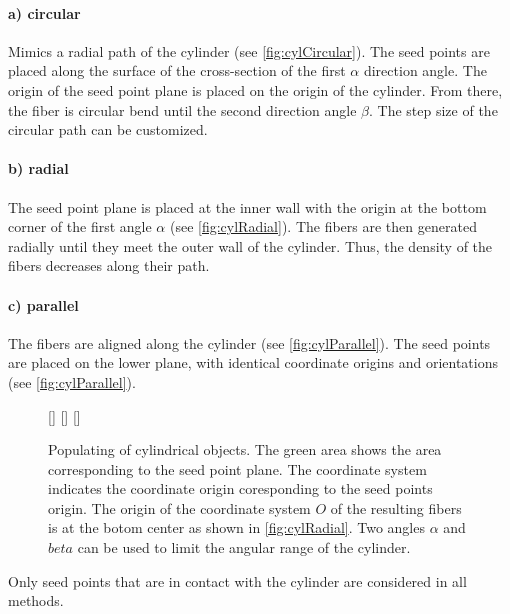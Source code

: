 \paragraph{a) circular}
Mimics a radial path of the cylinder (see \cref{fig:cylCircular}).
The seed points are placed along the surface of the cross-section of the first $\alpha$ direction angle.
The origin of the seed point plane is placed on the origin of the cylinder.
From there, the fiber is circular bend until the second direction angle $\beta$.
The step size of the circular path can be customized.
%
\paragraph{b) radial}
The seed point plane is placed at the inner wall with the origin at the bottom corner of the first angle $\alpha$ (see \cref{fig:cylRadial}).
The fibers are then generated radially until they meet the outer wall of the cylinder.
Thus, the density of the fibers decreases along their path.
%
\paragraph{c) parallel}
The fibers are aligned along the cylinder (see \cref{fig:cylParallel}).
The seed points are placed on the lower plane, with identical coordinate origins and orientations (see \cref{fig:cylParallel}).
%
\begin{figure}[!t]
    \centering
    \setlength{\tikzwidth}{0.3\textwidth}
    \captionsetup[subfigure]{skip=-10pt}
    [\tikzwidth]{%
    }\hfill
    [\tikzwidth]{%
    }\hfill
    [\tikzwidth]{%
    }
	\caption{Populating of cylindrical objects.
    The green area shows the area corresponding to the seed point plane.
    The coordinate system indicates the coordinate origin coresponding to the seed points origin.
    The origin of the coordinate system $O$ of the resulting fibers is at the botom center as shown in \cref{fig:cylRadial}.
    Two angles $\alpha$ and $beta$ can be used to limit the angular range of the cylinder.}
\end{figure}
%
\par
Only seed points that are in contact with the cylinder are considered in all methods.
%
%
